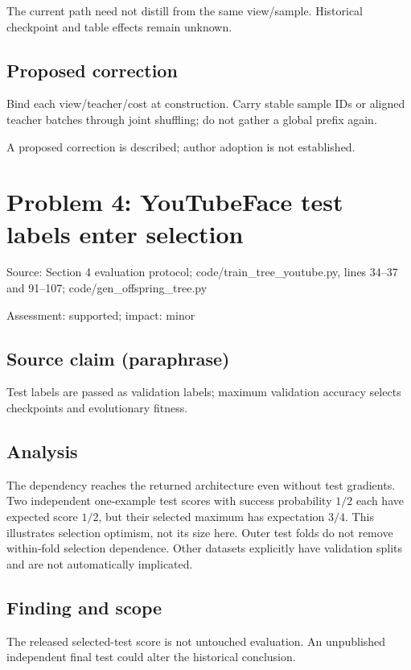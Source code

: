 \documentclass[11pt]{article}
\begin{document}
The current path need not distill from the same view/sample. Historical checkpoint and table effects remain unknown.

\subsection*{Proposed correction}

Bind each view/teacher/cost at construction. Carry stable sample IDs or aligned teacher batches through joint shuffling; do not gather a global prefix again.

A proposed correction is described; author adoption is not established.

\section*{Problem 4: YouTubeFace test labels enter selection}

Source: Section 4 evaluation protocol; code/train\_tree\_youtube.py, lines 34–37 and 91–107; code/gen\_offspring\_tree.py

Assessment: supported; impact: minor

\subsection*{Source claim (paraphrase)}

Test labels are passed as validation labels; maximum validation accuracy selects checkpoints and evolutionary fitness.

\subsection*{Analysis}

The dependency reaches the returned architecture even without test gradients. Two independent one-example test scores with success probability \(1/2\) each have expected score \(1/2\), but their selected maximum has expectation \(3/4\). This illustrates selection optimism, not its size here. Outer test folds do not remove within-fold selection dependence. Other datasets explicitly have validation splits and are not automatically implicated.

\subsection*{Finding and scope}

The released selected-test score is not untouched evaluation. An unpublished independent final test could alter the historical conclusion.
\end{document}
